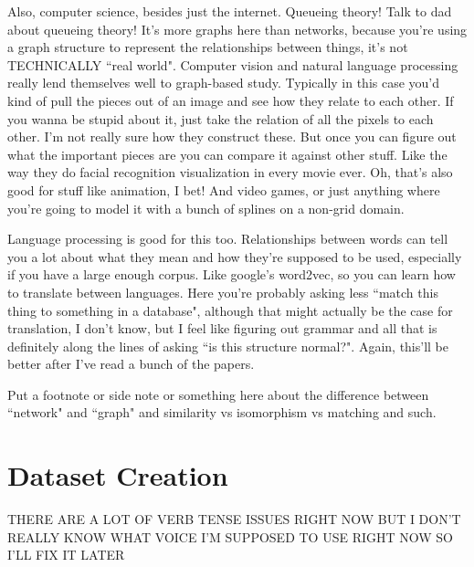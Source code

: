 \documentclass[12pt]{thesis}
\theoremstyle{plain}
\theoremstyle{definition}
\theoremstyle{remark}
\begin{document}
Also, computer science, besides just the internet. Queueing theory! Talk to dad about queueing theory! It's more graphs here than networks, because you're using a graph structure to represent the relationships between things, it's not TECHNICALLY ``real world".  Computer vision and natural language processing really lend themselves well to graph-based study. Typically in this case you'd kind of pull the pieces out of an image and see how they relate to each other. If you wanna be stupid about it, just take the relation of all the pixels to each other. I'm not really sure how they construct these. But once you can figure out what the important pieces are you can compare it against other stuff. Like the way they do facial recognition visualization in every movie ever. Oh, that's also good for stuff like animation, I bet! And video games, or just anything where you're going to model it with a bunch of splines on a non-grid domain. 

Language processing is good for this too. Relationships between words can tell you a lot about what they mean and how they're supposed to be used, especially if you have a large enough corpus. Like google's word2vec, so you can learn how to translate between languages. Here you're probably asking less ``match this thing to something in a database", although that might actually be the case for translation, I don't know, but I feel like figuring out grammar and all that is definitely along the lines of asking ``is this structure normal?". Again, this'll be better after I've read a bunch of the papers.

Put a footnote or side note or something here about the difference between ``network" and ``graph" and similarity vs isomorphism vs matching and such.


\section{Dataset Creation} %


THERE ARE A LOT OF VERB TENSE ISSUES RIGHT NOW BUT I DON'T REALLY KNOW WHAT VOICE I'M SUPPOSED TO USE RIGHT NOW SO I'LL FIX IT LATER

\end{document}

